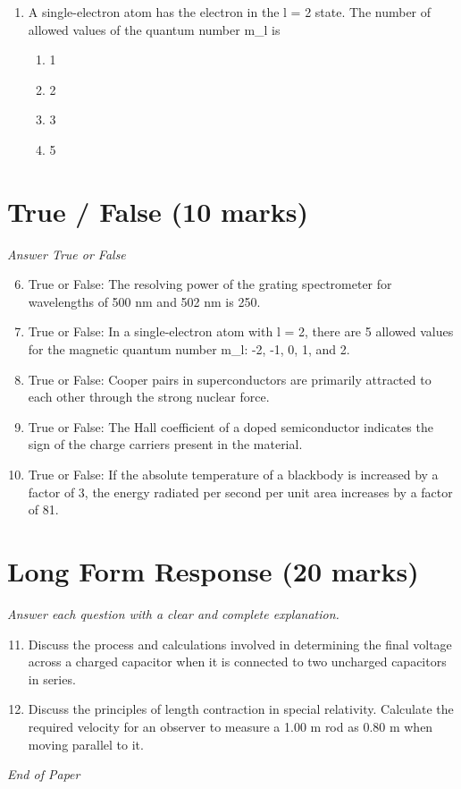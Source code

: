\documentclass[12pt]{article}
\begin{document}
\begin{enumerate}[label=\arabic*.]
\begin{enumerate}[label=(\alph*)]
    \item n = 3, l = 2
    \item n = 3, l = 1
    \item n = 3, l = 0
    \item n = 2, l = 0
\end{enumerate}
\item A single-electron atom has the electron in the l = 2 state. The number of allowed values of the quantum number m\_l is
\begin{enumerate}[label=(\alph*)]
    \item 1
    \item 2
    \item 3
    \item 5
\end{enumerate}
\end{enumerate}

\section*{True / False (10 marks)}
\textit{Answer True or False}
\begin{enumerate}[label=\arabic*.]
\setcounter{enumi}{5}
\item True or False: The resolving power of the grating spectrometer for wavelengths of 500 nm and 502 nm is 250.
\item True or False: In a single-electron atom with l = 2, there are 5 allowed values for the magnetic quantum number m\_l: -2, -1, 0, 1, and 2.
\item True or False: Cooper pairs in superconductors are primarily attracted to each other through the strong nuclear force.
\item True or False: The Hall coefficient of a doped semiconductor indicates the sign of the charge carriers present in the material.
\item True or False: If the absolute temperature of a blackbody is increased by a factor of 3, the energy radiated per second per unit area increases by a factor of 81.
\end{enumerate}

\section*{Long Form Response (20 marks)}
\textit{Answer each question with a clear and complete explanation.}
\begin{enumerate}[label=\arabic*.]
\setcounter{enumi}{10}
\item Discuss the process and calculations involved in determining the final voltage across a charged capacitor when it is connected to two uncharged capacitors in series.
\item Discuss the principles of length contraction in special relativity. Calculate the required velocity for an observer to measure a 1.00 m rod as 0.80 m when moving parallel to it.
\end{enumerate}

\vfill
\noindent\textit{End of Paper}
\end{document}
